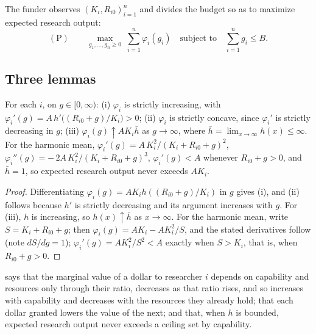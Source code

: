 The funder observes $(K_i, R_{i0})_{i=1}^n$ and divides the budget so as to maximize expected research output:
\[
(\mathrm{P}) \qquad \max_{g_1, \ldots, g_n \geq 0} \; \sum_{i=1}^n \varphi_i(g_i) \quad \text{subject to} \quad \sum_{i=1}^n g_i \leq B.
\]

\subsection*{Three lemmas}

\begin{lemma}\label{lem:return}
For each $i$, on $g \in [0, \infty)$: (i) $\varphi_i$ is strictly increasing, with $\varphi_i'(g) = A\,h'\!\big((R_{i0} + g)/K_i\big) > 0$; (ii) $\varphi_i$ is strictly concave, since $\varphi_i'$ is strictly decreasing in $g$; (iii) $\varphi_i(g) \uparrow A K_i \bar h$ as $g \to \infty$, where $\bar h = \lim_{x \to \infty} h(x) \leq \infty$. For the harmonic mean, $\varphi_i'(g) = A\,K_i^2/(K_i + R_{i0} + g)^2$, $\varphi_i''(g) = -\,2A\,K_i^2/(K_i + R_{i0} + g)^3$, $\varphi_i'(g) < A$ whenever $R_{i0} + g > 0$, and $\bar h = 1$, so expected research output never exceeds $AK_i$.
\end{lemma}

\begin{proof}
Differentiating $\varphi_i(g) = A K_i h((R_{i0} + g)/K_i)$ in $g$ gives (i), and (ii) follows because $h'$ is strictly decreasing and its argument increases with $g$. For (iii), $h$ is increasing, so $h(x) \uparrow \bar h$ as $x \to \infty$. For the harmonic mean, write $S = K_i + R_{i0} + g$; then $\varphi_i(g) = AK_i - AK_i^2/S$, and the stated derivatives follow (note $dS/dg = 1$); $\varphi_i'(g) = AK_i^2/S^2 < A$ exactly when $S > K_i$, that is, when $R_{i0} + g > 0$.
\end{proof}

 says that the marginal value of a dollar to researcher $i$ depends on capability and resources only through their ratio, decreases as that ratio rises, and so increases with capability and decreases with the resources they already hold; that each dollar granted lowers the value of the next; and that, when $h$ is bounded, expected research output never exceeds a ceiling set by capability.

